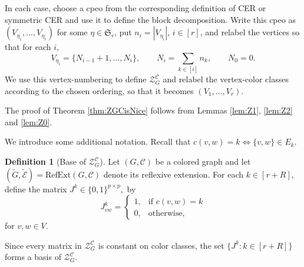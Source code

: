 \documentclass[12pt]{amsart}
\theoremstyle{plain}
\theoremstyle{definition}
\newtheorem{definition}[theorem]{Definition}
\theoremstyle{remark}
\newcommand{\1}{\mathbf{1}}
\newcommand{\coloredZ}{\mathcal{Z}_{G}^{\mathcal{C}}}
\newcommand{\RefExt}{\mathrm{RefExt}}
\begin{document}
In each case, choose a cpeo from the corresponding
definition of CER or symmetric CER
and use it to define the block decomposition.
Write this cpeo as $(V_{\eta_1},\ldots,V_{\eta_r})$ for some
$\eta\in\mathfrak{S}_r$, put $n_i=|V_{\eta_i}|$, $i\in[r]$,
and relabel the vertices so that for each $i$,
\[
V_{\eta_i}=\{N_{i-1}+1,\ldots,N_i\},\qquad
N_i=\sum_{k\in[i]}n_k,\qquad N_0=0.
\]
We use this vertex-numbering to define $\coloredZ$ and relabel
the vertex-color classes according to the chosen ordering,
so that it becomes $(V_1,\ldots,V_r)$.

The proof of Theorem \ref{thm:ZGCisNice} follows from Lemmas \ref{lem:Z1}, \ref{lem:Z2} and \ref{lem:Z0}.


We introduce some additional notation. Recall that $c(v,w) = k \iff \{v,w\}\in E_k$.
\begin{definition}[Base of $\coloredZ$]\label{def:base}
Let \((G,\mathcal{C})\) be a colored graph and let \((\tilde{G},\tilde{\mathcal{E}}) = \RefExt(G,\mathcal{C})\) denote its reflexive extension.
For each $k\in [r+R]$, define the matrix $J^k\in\{0,1\}^{p\times p},$ by
\[
J^k_{vw} =\begin{cases}
1, & \text{if }c(v,w) = k\\
0, & \text{otherwise},
\end{cases}
\]
for $v,w\in V$.

Since every matrix in \(\coloredZ\) is constant on color classes, the set $\{J^k\colon k\in [r+R]\}$ forms a basis of $\coloredZ$.

\end{definition}
\end{document}
